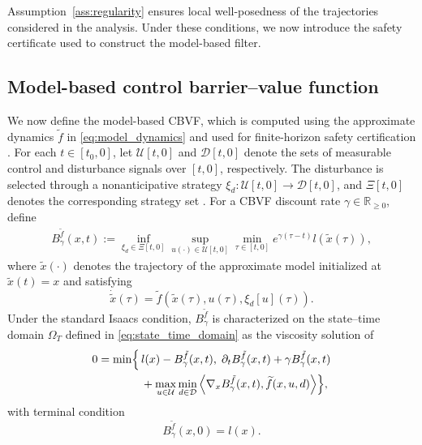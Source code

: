 \documentclass[letterpaper,10pt,conference]{ieeeconf}
\newcommand{\R}{\mathbb{R}}
\newcommand{\Bm}{B_{\gamma}^{\tilde f}}
\newcommand{\fapp}{\widetilde{f}}
\newcommand{\xv}{x}
\newcommand{\uv}{u}
\newcommand{\dv}{d}
\newcommand{\Uv}{\mathcal{U}}
\newcommand{\Dv}{\mathcal{D}}
\newcommand{\Xiv}{\Xi}
\newcommand{\ip}[2]{\left\langle #1,#2 \right\rangle}
\begin{document}
Assumption~\ref{ass:regularity} ensures local well-posedness of the
trajectories considered in the analysis. Under these conditions, we now introduce the safety certificate used to
construct the model-based filter.





\subsection{Model-based control barrier--value function}

We now define the model-based CBVF, which is computed using the approximate
dynamics $\fapp$ in \eqref{eq:model_dynamics} and used for finite-horizon safety
certification \cite{choi2021cbvf}. For each $t\in[t_0,0]$, let $\Uv[t,0]$ and
$\Dv[t,0]$ denote the sets of measurable control and disturbance signals over
$[t,0]$, respectively. The disturbance is selected through a nonanticipative
strategy $\xi_{\dv}:\Uv[t,0]\to\Dv[t,0]$, and $\Xiv[t,0]$ denotes the
corresponding strategy set \cite{mitchell2005time}. For a CBVF discount rate $\gamma\in\R_{\ge0}$, define
\begin{equation}
\begin{aligned}
    \Bm(\xv,t)
    :=
    \inf_{\xi_{\dv}\in\Xiv[t,0]}
    \sup_{\uv(\cdot)\in\Uv[t,0]}
    \min_{\tau\in[t,0]}
    e^{\gamma(\tau-t)}l(\tilde{\xv}(\tau)),
\end{aligned}
\label{eq:model_cbvf}
\end{equation}
where $\tilde{\xv}(\cdot)$ denotes the trajectory of the approximate model
initialized at $\tilde{\xv}(t)=\xv$ and satisfying
\begin{equation}
    \dot{\tilde\xv}(\tau)=
    \fapp(\tilde\xv(\tau),\uv(\tau),\xi_{\dv}[\uv](\tau)).
    \label{eq:model_cbvf_traj}
\end{equation}
Under the standard Isaacs condition, $\Bm$ is characterized on the state--time
domain $\Omega_T$ defined in \eqref{eq:state_time_domain} as the viscosity
solution of
\begin{equation}
\label{eq:model_cbvf_vi}
\begin{aligned}
0=\min\Bigl\{\, &l(\xv)-\Bm(\xv,t),\;
\partial_t \Bm(\xv,t)+\gamma\Bm(\xv,t) \\
&+\max_{\uv\in\Uv}\min_{\dv\in\Dv}
\ip{\nabla_{\xv}\Bm(\xv,t)}{\fapp(\xv,\uv,\dv)}
\Bigr\},
\end{aligned}
\end{equation}
with terminal condition
\begin{equation}
    \Bm(\xv,0)=l(\xv).
    \label{eq:model_cbvf_terminal}
\end{equation}
\end{document}
